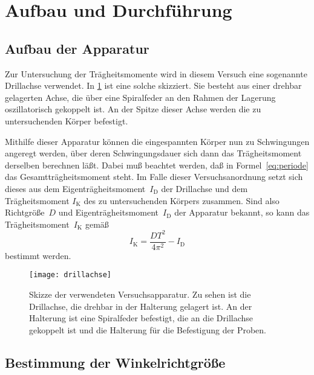 
\section{Aufbau und Durchführung}

\subsection{Aufbau der Apparatur}

Zur Untersuchung der Trägheitsmomente wird in diesem Versuch eine
sogenannte Drillachse verwendet.  In \cref{fig:drillachse} ist eine
solche skizziert.  Sie besteht aus einer drehbar gelagerten Achse, die
über eine Spiralfeder an den Rahmen der Lagerung oszillatorisch
gekoppelt ist.  An der Spitze dieser Achse werden die zu untersuchenden
Körper befestigt.

Mithilfe dieser Apparatur können die eingespannten Körper nun zu
Schwingungen angeregt werden, über deren Schwingungsdauer sich dann das
Trägheitsmoment derselben berechnen läßt.  Dabei muß beachtet werden,
daß in Formel~\eqref{eq:periode} das Gesamtträgheitsmoment steht.  Im
Falle dieser Versuchsanordnung setzt sich dieses aus dem
Eigenträgheitsmoment~$I_\text{D}$ der Drillachse und dem Trägheitsmoment
$I_\text{K}$ des zu untersuchenden Körpers zusammen.  Sind also
Richtgröße~$D$ und Eigenträgheitsmoment~$I_\text{D}$ der Apparatur
bekannt, so kann das Trägheitsmoment~$I_\text{K}$ gemäß
\begin{equation}
  \label{eq:traegheit-winkelricht-drill}
  I_\text{K} = \frac{D T^2}{4 \pi^2} - I_\text{D}
\end{equation}
bestimmt werden.

\begin{figure}
  \centering
  \texttt{[image: drillachse]}
  \caption{Skizze der verwendeten Versuchsapparatur. Zu sehen ist die
    Drillachse, die drehbar in der Halterung gelagert ist. An der
    Halterung ist eine Spiralfeder befestigt, die an die Drillachse
    gekoppelt ist und die Halterung für die Befestigung der Proben.}
  \label{fig:drillachse}
\end{figure}

\subsection{Bestimmung der Winkelrichtgröße}

